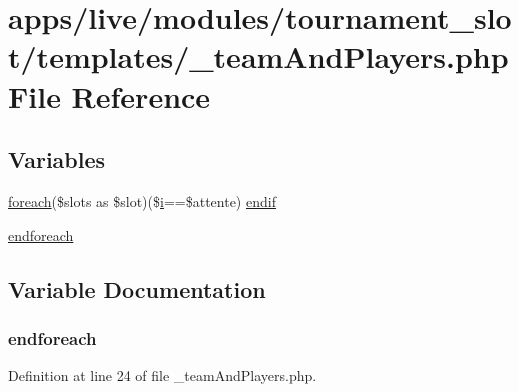 \hypertarget{live_2modules_2tournament__slot_2templates_2__team_and_players_8php}{\section{apps/live/modules/tournament\-\_\-slot/templates/\-\_\-team\-And\-Players.php File Reference}
\label{live_2modules_2tournament__slot_2templates_2__team_and_players_8php}
}
\subsection*{Variables}
\begin{DoxyCompactItemize}
\item 
\hyperlink{presse_2modules_2news_2templates_2index_success_8php_abc56db52b2e9a59bcd5c9e45ac5cb332}{foreach}(\$slots as \$slot)(\$\hyperlink{live_2modules_2partner_2templates_2__rolling_8php_a7e98b8a17c0aad30ba64d47b74e2a6c1}{i}==\$attente) \hyperlink{live_2modules_2tournament__slot_2templates_2__team_and_players_8php_a7c2b9543f95af16d38789813e30121e7}{endif}
\item 
\hyperlink{live_2modules_2tournament__slot_2templates_2__team_and_players_8php_a672d9707ef91db026c210f98cc601123}{endforeach}
\end{DoxyCompactItemize}


\subsection{Variable Documentation}
\hypertarget{live_2modules_2tournament__slot_2templates_2__team_and_players_8php_a672d9707ef91db026c210f98cc601123}{
\subsubsection[{endforeach}]{\setlength{\rightskip}{0pt plus 5cm}endforeach}}\label{live_2modules_2tournament__slot_2templates_2__team_and_players_8php_a672d9707ef91db026c210f98cc601123}


Definition at line 24 of file \-\_\-team\-And\-Players.\-php.

